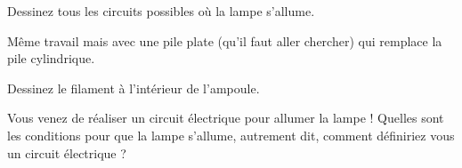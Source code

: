 \documentclass[11pt]{article}
\begin{document}
\begin{question}



\begin{subquestion}{
	Dessinez tous les circuits possibles où la lampe s’allume.
	} %

\end{subquestion}


\begin{subquestion}{
	Même travail mais avec une pile plate (qu'il faut aller chercher) 
	qui remplace la pile cylindrique.
	} 
\end{subquestion}

\begin{subquestion}{
	Dessinez le filament à l’intérieur de l’ampoule.
	} 
\end{subquestion}

\begin{subquestion}{
	Vous venez de réaliser un circuit électrique pour allumer la lampe !
	Quelles sont les conditions pour que la lampe s’allume, autrement dit,
	comment définiriez vous un circuit électrique ?	
	} 
\end{subquestion}

\end{question}
\end{document}
